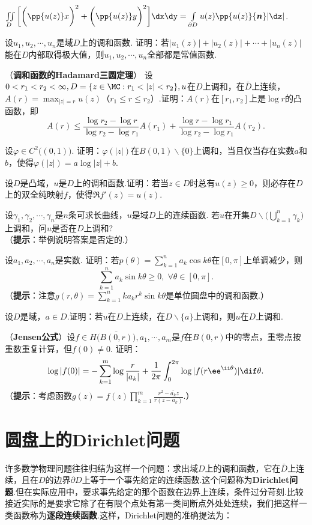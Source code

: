 \begin{xiti}
\begin{enuma}
  \item $\iint\limits_D\bigg[\bigg(\pp{u(z)}x\bigg)^2+\bigg(\pp{u(z)}y\bigg)^2\bigg]
  \dx\dy=\int\limits_{\partial D}u(z)\pp{u(z)}{\boldsymbol n}|\dz|$.
\end{enuma}
\item 设$u_1,u_2,\cdots,u_n$是域$D$上的调和函数. 证明：若$|u_1(z)|+|u_2(z)|+\cdots+|u_n(z)|$能在$D$内部取得极大值，则$u_1,u_2,\cdots,u_n$全部都是常值函数.
\item （\textbf{调和函数的Hadamard三圆定理}）
设$0<r_1<r_2<\infty,D=\{z\in\MC:r_1<|z|<r_2\},u$在$D$上调和，在$\bar D$上连续，$A(r)=\max_{|z|=r}u(z)$（$r_1\le r\le r_2$）.证明：$A(r)$在$[r_1,r_2]$上是$\log r$的凸函数，即
\[A(r)\le\frac{\log r_2-\log r}{\log r_2-\log r_1}A(r_1)+\frac{\log r-\log r_1}
{\log r_2-\log r_1}A(r_2).\]
\item 设$\varphi\in C^2\big((0,1)\big)$. 证明：$\varphi(|z|)$在$B(0,1)\backslash\{0\}$上调和，当且仅当存在实数$a$和$b$，使得$\varphi(|z|)=a\log|z|+b$.
\item 设$D$是凸域，$u$是$D$上的调和函数.证明：若当$z\in D$时总有$u(z)\ge0$，则必存在$D$上的双全纯映射$f$，使得$\Re f'(z)=u(z)$.
\item 设$\gamma_1,\gamma_2,\cdots,\gamma_n$是$n$条可求长曲线，$u$是域$D$上的连续函数. 若$u$在开集$D\backslash\big(\bigcup_{k=1}^n\gamma_k\big)$上调和，问$u$是否在$D$上调和?\\
（\textbf{提示}：举例说明答案是否定的.）
\item 设$a_1,a_2,\cdots,a_n$是实数. 证明：若$p(\theta)=\sum_{k=1}^na_k\cos k\theta$在$[0,\pi]$上单调减少，则
    \[\sum_{k=1}^n a_k\sin k\theta\ge0,\;\forall \theta\in[0,\pi].\]
（\textbf{提示}：注意$g(r,\theta)=\sum_{k=1}^nka_kr^k\sin k\theta$是单位圆盘中的调和函数.）
\item 设$D$是域，$a\in D$.证明：若$u$在$D$上连续，在$D\backslash\{a\}$上调和，则$u$在$D$上调和.
\item （\textbf{Jensen公式}）设$f\in H\big(\bar{B(0,r)}\big),a_1,\cdots,a_m$是$f$在$B(0,r)$中的零点，重零点按重数重复计算，但$f(0)\ne0$. 证明：
\[\log|f(0)|=-\sum_{k=1}^m\log\frac r{|a_k|}+\frac1{2\pi}\int_0^{2\pi}
\log|f(r\ee^{\ii\theta})|\dif \theta.\]
（\textbf{提示}：考虑函数$g(z)=f(z)\prod_{k=1}^m\frac{r^2-\bar{a_k}z}{r(z-a_k)}$.）
\end{xiti}

\section{圆盘上的Dirichlet问题\label{sec8.2}}
许多数学物理问题往往归结为这样一个问题：求出域$D$上的调和函数，它在$\bar D$上连续，且在$D$的边界$\partial D$上等于一个事先给定的连续函数.这个问题称为\textbf{Dirichlet问题}.但在实际应用中，要求事先给定的那个函数在边界上连续，条件过分苛刻.比较接近实际的是要求它除了在有限个点处有第一类间断点外处处连续，我们把这样一类函数称为\textbf{逐段连续函数}.这样，Dirichlet问题的准确提法为：

